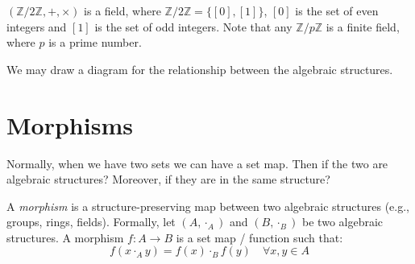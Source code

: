\documentclass[
	11pt, %
	fleqn, %
	a4paper, %
]{LegrandOrangeBook}
\begin{document}
\begin{example}
    $(\mathbb{Z}/2\mathbb{Z}, +, \times)$ is a field, where $\mathbb{Z}/2\mathbb{Z} = \{[0], [1]\}$, $[0]$ is the set of even integers and $[1]$ is the set of odd integers. Note that any $\mathbb{Z}/p\mathbb{Z}$ is a finite field, where $p$ is a prime number.
\end{example}

We may draw a diagram for the relationship between the algebraic structures.

\begin{center}
\end{center}

\newpage

\section{Morphisms}

Normally, when we have two sets we can have a set map. Then if the two are algebraic structures? Moreover, if they are in the same structure?

\begin{definition}[Morphisms]
    A \emph{morphism} is a structure-preserving map between two algebraic structures (e.g., groups, rings, fields). Formally, let $(A, \cdot_A)$ and $(B, \cdot_B)$ be two algebraic structures. A morphism $f: A \to B$ is a set map / function such that:
    \[
        f(x \cdot_A y) = f(x) \cdot_B f(y) \quad \forall x, y \in A
    \]
\end{definition}
\end{document}
